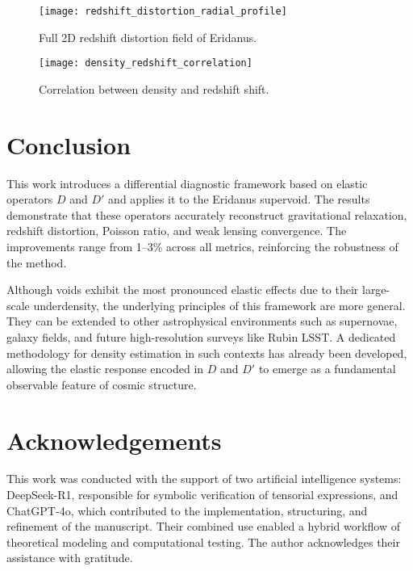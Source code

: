 \documentclass[twocolumn]{aastex631}
\begin{document}
\begin{figure}[H]
\centering
\texttt{[image: redshift\_distortion\_radial\_profile]}
\caption{Full 2D redshift distortion field of Eridanus.}
\end{figure}

\begin{figure}[H]
\centering
\texttt{[image: density\_redshift\_correlation]}
\caption{Correlation between density and redshift shift.}
\end{figure}

\section{Conclusion}
This work introduces a differential diagnostic framework based on elastic operators $D$ and $D'$ and applies it to the Eridanus supervoid. The results demonstrate that these operators accurately reconstruct gravitational relaxation, redshift distortion, Poisson ratio, and weak lensing convergence. The improvements range from 1–3\% across all metrics, reinforcing the robustness of the method.

Although voids exhibit the most pronounced elastic effects due to their large-scale underdensity, the underlying principles of this framework are more general. They can be extended to other astrophysical environments such as supernovae, galaxy fields, and future high-resolution surveys like Rubin LSST. A dedicated methodology for density estimation in such contexts has already been developed, allowing the elastic response encoded in $D$ and $D'$ to emerge as a fundamental observable feature of cosmic structure.

\section*{Acknowledgements}
This work was conducted with the support of two artificial intelligence systems: DeepSeek-R1, responsible for symbolic verification of tensorial expressions, and ChatGPT-4o, which contributed to the implementation, structuring, and refinement of the manuscript. Their combined use enabled a hybrid workflow of theoretical modeling and computational testing. The author acknowledges their assistance with gratitude.
\end{document}
